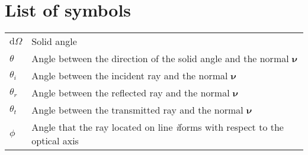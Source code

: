 
\newcommand{\set}[3]{\emph{#1}_{\textit{#2#3}}}
\newcommand{\map}[3]{\mathrm{#1}_{\textit{#2#3}}}
\newcommand{\setbound}[4]{\emph{#1}_{\textit{#2#3}}^{#4}}
\newcommand{\variabile}[1]{\textit{#1}}
\newcommand{\inversemap}[3]{\mathrm{#1}_{\textit{#2#3}}^{-1}}
\newcommand{\vect}[1]{\textit{\textbf{#1}}}
\newcommand{\point}[1]{\textsf{#1}}
\newcommand{\scalar}[2]{(#1 #2)}
\newcommand{\const}[1]{\textrm{#1}}
\newcommand{\myangle}{\theta}
\newcommand{\mytime}{T}
\newcommand{\mynormal}{$\boldsymbol{\nu}$}
\newcommand{\lineai}{\variabile{i}}
\newcommand{\lineaj}{\variabile{j}}
\newcommand{\lineak}{\variabile{k}}
\newcommand{\nline}{\textrm{Nl}}
\newcommand{\n}{\variabile{n}}
\newcommand{\optangle}{\phi}
\newcommand{\psangle}{\tau}

\chapter*{List of symbols}


\begin{tabular}{l l}

$\textrm{d}{\Omega}$ & {Solid angle}\\
$\myangle$& {Angle between the direction of the solid angle and the normal $\boldsymbol{\nu}$}\\
$\myangle_i$& {Angle between the incident ray and the normal \mynormal}\\
$\myangle_r$ &{Angle between the reflected ray and the normal \mynormal}\\
$\myangle_t$ & {Angle between the transmitted ray and the normal \mynormal}\\
$\optangle$ & {Angle that the ray located on line \lineai forms with respect to the optical axis}\\

\end{tabular}

%